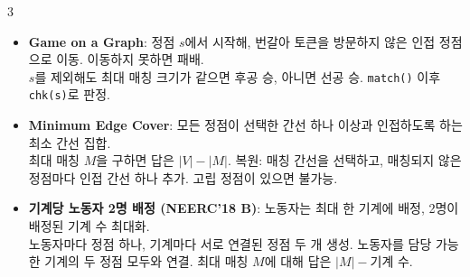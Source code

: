 \documentclass[landscape, 8pt, a4paper, oneside]{extarticle}
\begin{document}
\begin{multicols*}{3}
  \begin{itemize}
    \item \textbf{Game on a Graph}: 정점 $s$에서 시작해, 번갈아 토큰을 방문하지 않은 인접 정점으로 이동. 이동하지 못하면 패배.\\
    $s$를 제외해도 최대 매칭 크기가 같으면 후공 승, 아니면 선공 승. \texttt{match()} 이후 \texttt{chk(s)}로 판정.
    \item \textbf{Minimum Edge Cover}: 모든 정점이 선택한 간선 하나 이상과 인접하도록 하는 최소 간선 집합.\\
    최대 매칭 $M$을 구하면 답은 $|V|-|M|$. 복원: 매칭 간선을 선택하고, 매칭되지 않은 정점마다 인접 간선 하나 추가. 고립 정점이 있으면 불가능.
    \item \textbf{기계당 노동자 2명 배정 (NEERC'18 B)}: 노동자는 최대 한 기계에 배정, 2명이 배정된 기계 수 최대화.\\
    노동자마다 정점 하나, 기계마다 서로 연결된 정점 두 개 생성. 노동자를 담당 가능한 기계의 두 정점 모두와 연결. 최대 매칭 $M$에 대해 답은 $|M|-\text{기계 수}$.
  \end{itemize}
  

\end{multicols*}
\end{document}
